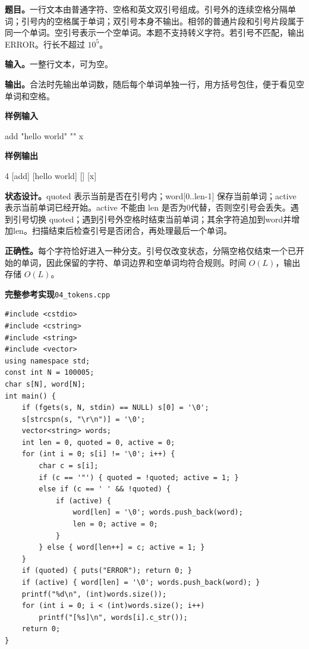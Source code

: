 \documentclass[UTF8,11pt,a4paper,fontset=none]{ctexart}
\begin{document}
\noindent\textbf{题目。}一行文本由普通字符、空格和英文双引号组成。引号外的连续空格分隔单词；引号内的空格属于单词；双引号本身不输出。相邻的普通片段和引号片段属于同一个单词。空引号表示一个空单词。本题不支持转义字符。若引号不匹配，输出 ERROR。行长不超过 $10^5$。

\noindent\textbf{输入。}一整行文本，可为空。

\noindent\textbf{输出。}合法时先输出单词数，随后每个单词单独一行，用方括号包住，便于看见空单词和空格。
\begin{tcolorbox}[samplebox,title={输入输出样例}]
\textbf{样例输入}
\begin{Sample}
add "hello world" "" x
\end{Sample}
\tcblower
\textbf{样例输出}
\begin{Sample}
4
[add]
[hello world]
[]
[x]
\end{Sample}
\end{tcolorbox}

\noindent\textbf{状态设计。}quoted 表示当前是否在引号内；word[0..len-1] 保存当前单词；active 表示当前单词已经开始。active 不能由 len 是否为0代替，否则空引号会丢失。遇到引号切换 quoted；遇到引号外空格时结束当前单词；其余字符追加到word并增加len。扫描结束后检查引号是否闭合，再处理最后一个单词。

\noindent\textbf{正确性。}每个字符恰好进入一种分支。引号仅改变状态，分隔空格仅结束一个已开始的单词，因此保留的字符、单词边界和空单词均符合规则。时间 $O(L)$，输出存储 $O(L)$。
\par\noindent\begin{minipage}{\linewidth}
\textbf{完整参考实现}\quad\texttt{04\_tokens.cpp}
\begin{lstlisting}
#include <cstdio>
#include <cstring>
#include <string>
#include <vector>
using namespace std;
const int N = 100005;
char s[N], word[N];
int main() {
    if (fgets(s, N, stdin) == NULL) s[0] = '\0';
    s[strcspn(s, "\r\n")] = '\0';
    vector<string> words;
    int len = 0, quoted = 0, active = 0;
    for (int i = 0; s[i] != '\0'; i++) {
        char c = s[i];
        if (c == '"') { quoted = !quoted; active = 1; }
        else if (c == ' ' && !quoted) {
            if (active) {
                word[len] = '\0'; words.push_back(word);
                len = 0; active = 0;
            }
        } else { word[len++] = c; active = 1; }
    }
    if (quoted) { puts("ERROR"); return 0; }
    if (active) { word[len] = '\0'; words.push_back(word); }
    printf("%d\n", (int)words.size());
    for (int i = 0; i < (int)words.size(); i++)
        printf("[%s]\n", words[i].c_str());
    return 0;
}
\end{lstlisting}
\end{minipage}\par
\end{document}
